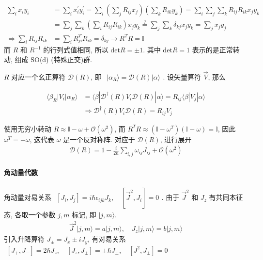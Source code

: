 \documentclass[../../main.tex]{subfiles}
\begin{document}
\begin{align*}
    \sum_{i}x_{i}y_{i} &= \sum_{i}x_{i}^{\prime}y_{i}^{\prime} = \sum_{i}\left(\sum_{j}R_{ij}x_{j}\right)\left(\sum_{k}R_{ik}y_{k}\right) = \sum_{i}\sum_{j}\sum_{k}R_{ij}R_{ik}x_{j}y_{k}\\
    &= \sum_{j}\sum_{k}\left(\sum_{i}  R_{ij}R_{ik}\right)x_{j}y_{k} \stackrel{?}{=} \sum_{j}\sum_{k}\delta_{kj}x_{j}y_{k} = \sum_{j}x_{j}y_{j}\\
    \Rightarrow \sum_{i}  R_{ij}R_{ik} &= \sum_{i} R^{T}_{ji}R_{ik} = \delta_{kj}\rightarrow R^{T}R = \mathbb{I}
\end{align*}
而 $R$ 和 $R^{-1}$ 的行列式值相同, 所以 $\text{det}R = \pm 1$. 其中 $\text{det}R=1$ 表示的是正常转动, 组成 SO(d) (特殊正交)群.

$R$ 对应一个幺正算符 $\mathcal{D}(R)$, 即 $\begin{aligned}
    |\alpha_{R}\rangle = \mathcal{D}(R)|\alpha\rangle
\end{aligned}$. 设矢量算符 $\vec{V}$, 那么

\begin{align*}
    \langle \beta_{R}|V_{i}|\alpha_{R}\rangle &= \langle \beta|\mathcal{D}^{\dagger}(R)V_{i}\mathcal{D}(R)|\alpha\rangle = R_{ij}\langle \beta|V_{j}|\alpha\rangle\\
    &\Rightarrow \mathcal{D}^{\dagger}(R)V_{i}\mathcal{D}(R) = R_{ij}V_{j}
\end{align*}

使用无穷小转动 $R\approx \mathbb{I} - \omega + \mathcal{O}(\omega^{2})$, 而 $R^{T}R \approx (\mathbb{I} -\omega^{T})(\mathbb{I}-\omega) = \mathbb{I}$, 因此 $\omega^{T} = -\omega$, 这代表 $\omega$ 是一个反对称阵. 对应于 $\mathcal{D}(R)$, 进行展开
\begin{align*}
    \mathcal{D}(R) = 1 -\frac{i}{2\hbar}\sum_{i,j}\omega_{ij}J_{ij} + \mathcal{O}(\omega^{2})
\end{align*}
\paragraph{角动量代数}
角动量对易关系 $\begin{aligned}
    [J_{i},J_{j}] = i\hbar\epsilon_{ijk}J_{k},\quad [\vec{J}^{2},J_{i}] = 0
\end{aligned}$. 
由于 $\vec{J}^{2}$ 和 $J_{z}$ 有共同本征态, 各取一个参数 $j,m$ 标记, 即 $|j,m\rangle$. 
\begin{align*}
    \vec{J}^{2}|j,m\rangle = a|j,m\rangle,\quad J_{z}|j,m\rangle = b|j,m\rangle
\end{align*}
引入升降算符 $J_{\pm} = J_{x}\pm iJ_{y}$, 有对易关系 $\begin{aligned}
    [J_{+},J_{-}] = 2\hbar J_{z},\quad [J_{z},J_{\pm}] = \pm\hbar J_{\pm},\quad [J^{2},J_{\pm}] = 0
\end{aligned}$
\end{document}
